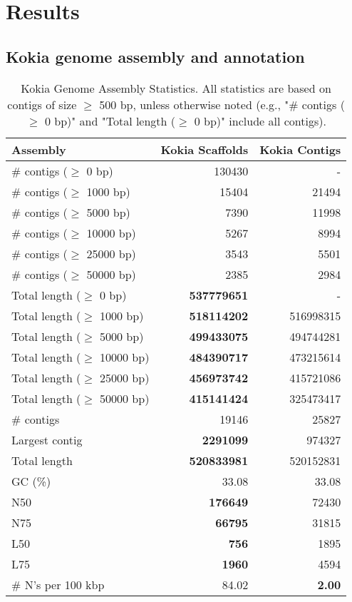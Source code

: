 \documentclass[10pt,letterpaper]{article}
\begin{document}
\section*{Results}

\subsection*{Kokia genome assembly and annotation}

\begin{table}[ht]
  \begin{center}
    \caption{Kokia Genome Assembly Statistics. All statistics are based on contigs of size $\geq$ 500 bp, unless otherwise noted (e.g., "\# contigs ($\geq$ 0 bp)" and "Total length ($\geq$ 0 bp)" include all contigs).}
    \begin{tabular}{l*{2}{r}}
      \toprule
      Assembly & Kokia Scaffolds & Kokia Contigs \\
      \midrule
      \# contigs ($\geq$ 0 bp) & 130430 & - \\ 
      \# contigs ($\geq$ 1000 bp) & 15404 & 21494 \\ 
      \# contigs ($\geq$ 5000 bp) & 7390 & 11998 \\ 
      \# contigs ($\geq$ 10000 bp) & 5267 & 8994 \\ 
      \# contigs ($\geq$ 25000 bp) & 3543 & 5501 \\ 
      \# contigs ($\geq$ 50000 bp) & 2385 & 2984 \\ 
      Total length ($\geq$ 0 bp) & {\bf 537779651} & - \\ 
      Total length ($\geq$ 1000 bp) & {\bf 518114202} & 516998315 \\ 
      Total length ($\geq$ 5000 bp) & {\bf 499433075} & 494744281 \\ 
      Total length ($\geq$ 10000 bp) & {\bf 484390717} & 473215614 \\ 
      Total length ($\geq$ 25000 bp) & {\bf 456973742} & 415721086 \\ 
      Total length ($\geq$ 50000 bp) & {\bf 415141424} & 325473417 \\ 
      \# contigs & 19146 & 25827 \\ 
      Largest contig & {\bf 2291099} & 974327 \\ 
      Total length & {\bf 520833981} & 520152831 \\ 
      GC (\%) & 33.08 & 33.08 \\ 
      N50 & {\bf 176649} & 72430 \\
      N75 & {\bf 66795} & 31815 \\
      L50 & {\bf 756} & 1895 \\ 
      L75 & {\bf 1960} & 4594 \\
      \# N's per 100 kbp & 84.02 & {\bf 2.00} \\
      \bottomrule
    \end{tabular}
  \end{center}
\end{table}
\end{document}
